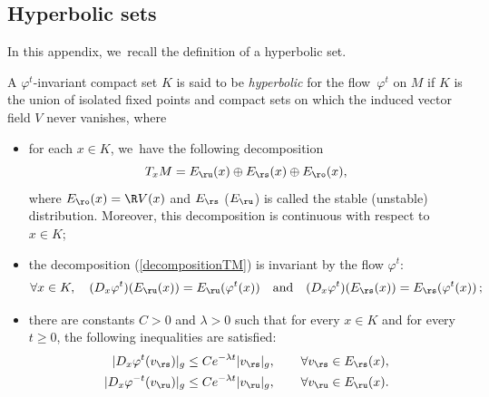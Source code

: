 \begin{appendix}

\section{Hyperbolic sets}\label{Appendix: hyperbolic set}

In this appendix, we~recall the definition of a hyperbolic set.

\begin{definition}A $\varphi^t$-invariant compact set $K$ is said to be \emph{hyperbolic} for the flow~$\varphi^t$ on $M$ if $K$ is the union of isolated fixed points and compact sets on which the induced vector field $V$ never vanishes, where
\begin{itemize}
\item for each $x \in K$, we~have the following decomposition
\begin{equation}\label{decompositionTM}
T_x M = E_\ru (x) \oplus E_\rs(x) \oplus E_\ro (x),
\end{equation}
where $E_\ro (x) = \R V(x)$ and $E_\rs$ (\resp $E_\ru$) is called the stable (\resp unstable) distribution. Moreover, this decomposition is continuous with respect to $x \in K$;
\item the decomposition (\ref{decompositionTM}) is invariant by the flow $\varphi^t$:
\[
\forall x \in K, \quad (D_x \varphi^t)(E_\ru(x)) = E_\ru(\varphi^t (x)) \quad \text{and} \quad (D_x \varphi^t)(E_\rs(x)) = E_\rs(\varphi^t (x))\,;
\]
\item there are constants $C > 0$ and $\lambda > 0$ such that for every $x \in K$ and for every $t \geq 0$, the following inequalities are satisfied:
\begin{equation}\label{eq: hyperbolic inegality on an hyperbolic set}
\begin{split}
| D_x \varphi^t (v_\rs) |_g &\leq C e^{-\lambda t} |v_\rs|_g, \quad \quad \forall v_\rs \in E_\rs(x), \\
| D_x \varphi^{-t} (v_\ru) |_g &\leq C e^{-\lambda t} |v_\ru|_g, \quad \quad \forall v_\ru \in E_\ru(x).
\end{split}
\end{equation}
\end{itemize}
\end{definition}


\end{appendix}
